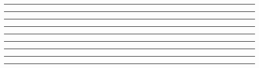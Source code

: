 \documentclass{article}
\begin{document}
\rule{\textwidth}{1pt}

\newpage



\rule{\textwidth}{1pt}



\rule{\textwidth}{1pt}



\rule{\textwidth}{1pt}



\rule{\textwidth}{1pt}



\rule{\textwidth}{1pt}



\rule{\textwidth}{1pt}



\rule{\textwidth}{1pt}



\rule{\textwidth}{1pt}
\end{document}
